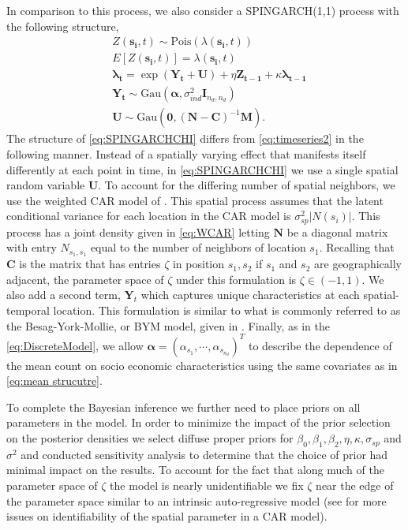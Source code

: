 \documentclass[11pt]{isuthesis}
\begin{document}
In comparison to this process, we also consider a SPINGARCH(1,1) process with the following structure,
\begin{align}
	& Z(\boldsymbol{s_i},t) \sim \mbox{Pois}(\lambda(\boldsymbol{s_i},t)) \label{eq:SPINGARCHCHI} \\
	& E[Z(\boldsymbol{s_i},t)]=\lambda(\boldsymbol{s_i},t)\\
	& \boldsymbol{\lambda_t} = \exp(\boldsymbol{Y_t}+\boldsymbol{U})+\eta \boldsymbol{Z_{t-1}}+\kappa \boldsymbol{\lambda_{t-1}}\\
	& \boldsymbol{Y_t} \sim \mbox{Gau}\textit{} (\boldsymbol{\alpha},\sigma_{ind}^2 \boldsymbol{I}_{{n_d},{n_d}})\\
	& \boldsymbol{U} \sim \mbox{Gau} (\boldsymbol{0},(\boldsymbol{N}-\boldsymbol{C})^{-1}\boldsymbol{M})\label{eq:WCAR}.
\end{align}
The structure of \eqref{eq:SPINGARCHCHI} differs from \eqref{eq:timeseries2} in the following manner.  Instead of a spatially varying effect that manifests itself differently at each point in time, in \eqref{eq:SPINGARCHCHI} we use a single spatial random variable $\boldsymbol{U}$.  To account for the differing number of spatial neighbors, we use the weighted CAR model of \cite{besag1991bayesian}.  This spatial process assumes that the latent conditional variance for each location in the CAR model is $\sigma^2_{sp} |N(s_i)|$.  This process has a joint density given in \eqref{eq:WCAR} letting $\boldsymbol{N}$ be a diagonal matrix with entry $N_{s_1,s_1}$ equal to the number of neighbors of location $s_1$.  Recalling that $\boldsymbol{C}$ is the matrix that has entries $\zeta$ in position $s_1,s_2$ if $s_1$ and $s_2$ are geographically adjacent, the parameter space of $\zeta$ under this formulation is $\zeta \in (-1,1)$.  We also add a second term, $\boldsymbol{Y}_t$ which captures unique characteristics at each spatial-temporal location.  This formulation is similar to what is commonly referred to as the Besag-York-Mollie, or BYM model, given in \cite{besag1991bayesian}.  Finally, as in the \eqref{eq:DiscreteModel}, we allow $\boldsymbol{\alpha}=(\alpha_{s_1},\cdots,\alpha_{s_{n_d}})^T$ to describe the dependence of the mean count on socio economic characteristics using the same covariates as in \eqref{eq:mean strucutre}.

To complete the Bayesian inference we further need to place priors on all parameters in the model.  In order to minimize the impact of the prior selection on the posterior densities we select diffuse proper priors for $\beta_0,\beta_1,\beta_2,\eta,\kappa,\sigma_{sp}$ and $\sigma^2$ and conducted sensitivity analysis to determine that the choice of prior had minimal impact on the results. To account for the fact that along much of the parameter space of $\zeta$ the model is nearly unidentifiable we fix $\zeta$ near the edge of the parameter space similar to an intrinsic auto-regressive model (see \cite{wall2004close} for more issues on identifiability of the spatial parameter in a CAR model).
\end{document}

